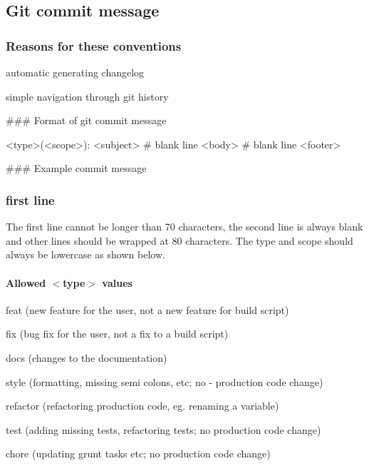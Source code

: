 \subsection*{Git commit message}

\subsubsection*{Reasons for these conventions}


\begin{DoxyItemize}
\item automatic generating changelog
\item simple navigation through git history
\end{DoxyItemize}

\#\#\# Format of git commit message 
\begin{DoxyCode}
<type>(<scope>): <subject>
# blank line
<body>
# blank line
<footer>
\end{DoxyCode}
 \#\#\# Example commit message 
 \subsubsection*{first line}

The first line cannot be longer than 70 characters, the second line is always blank and other lines should be wrapped at 80 characters. The type and scope should always be lowercase as shown below. \paragraph*{Allowed $<$type$>$ values}


\begin{DoxyItemize}
\item feat (new feature for the user, not a new feature for build script)
\item fix (bug fix for the user, not a fix to a build script)
\item docs (changes to the documentation)
\item style (formatting, missing semi colons, etc; no -\/ production code change)
\item refactor (refactoring production code, eg. renaming a variable)
\item test (adding missing tests, refactoring tests; no production code change)
\item chore (updating grunt tasks etc; no production code change)
\end{DoxyItemize}

